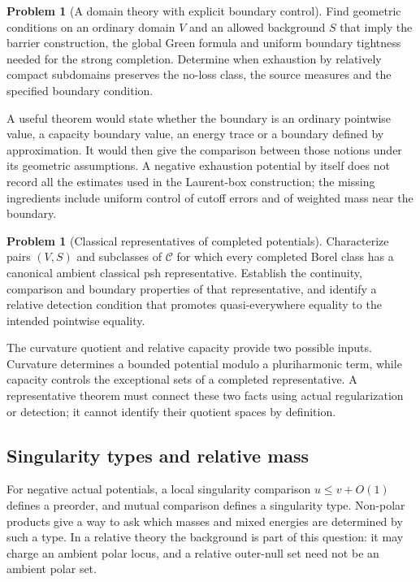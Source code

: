 \documentclass[11pt,a4paper]{article}
\theoremstyle{definition}
\newtheorem{problem}[theorem]{Problem}
\theoremstyle{remark}
\numberwithin{equation}{section}
\newcommand{\C}{\mathscr C}
\begin{document}
\begin{problem}[A domain theory with explicit boundary control]
\label{problem:domains}
Find geometric conditions on an ordinary domain $V$ and an allowed
background $S$ that imply the barrier construction, the global Green
formula and uniform boundary tightness needed for the strong
completion.  Determine when exhaustion by relatively compact
subdomains preserves the no-loss class, the source measures and the
specified boundary condition.
\end{problem}

A useful theorem would state whether the boundary is an ordinary
pointwise value, a capacity boundary value, an energy trace or a
boundary defined by approximation.  It would then give the comparison
between those notions under its geometric assumptions.  A negative
exhaustion potential by itself does not record all the estimates used
in the Laurent-box construction; the missing ingredients include
uniform control of cutoff errors and of weighted mass near the
boundary.

\begin{problem}[Classical representatives of completed potentials]
\label{problem:representatives}
Characterize pairs $(V,S)$ and subclasses of $\C$ for which every
completed Borel class has a canonical ambient classical psh
representative.  Establish the continuity, comparison and boundary
properties of that representative, and identify a relative detection
condition that promotes quasi-everywhere equality to the intended
pointwise equality.
\end{problem}

The curvature quotient and relative capacity provide two possible
inputs.  Curvature determines a bounded potential modulo a
pluriharmonic term, while capacity controls the exceptional sets of
a completed representative.  A representative theorem must connect
these two facts using actual regularization or detection; it cannot
identify their quotient spaces by definition.

\subsection{Singularity types and relative mass}

For negative actual potentials, a local singularity comparison
$u\le v+O(1)$ defines a preorder, and mutual comparison defines a
singularity type.  Non-polar products give a way to ask which masses
and mixed energies are determined by such a type.  In a relative
theory the background is part of this question: it may charge an
ambient polar locus, and a relative outer-null set need not be an
ambient polar set.
\end{document}
